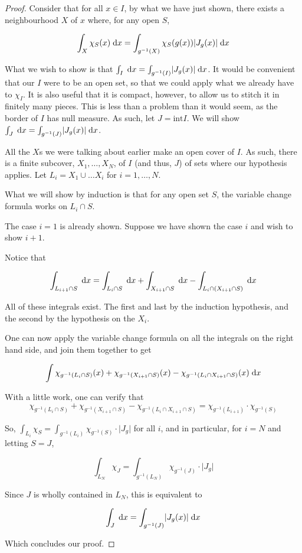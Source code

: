 \documentclass[11pt]{article}
\theoremstyle{definition}
\theoremstyle{plain}
\newcommand{\mo}{^{-1}}
\begin{document}
\begin{proof}
Consider that for all $x \in I$, by what we have just shown, there exists a neighbourhood $X$ of $x$ where, for any open $S$,

\[ \int_X \chi_S(x) \d x = \int_{g\mo(X)} \chi_S(g(x)) \rvert J_g(x) \lvert \d x \]

What we wish to show is that $\int_I \d x = \int_{g\mo(I)} \rvert J_g(x) \lvert \d x$. It would be convenient that our $I$ were to be an open set, so that we could apply what we already have to $\chi_I$. It is also useful that it is compact, however, to allow us to stitch it in finitely many pieces. This is less than a problem than it would seem, as the border of $I$ has null measure. As such, let $J = \textrm{int} I$. We will show $\int_J \d x = \int_{g\mo(J)} \rvert J_g(x) \lvert \d x$.

All the $X$s we were talking about earlier make an open cover of $I$. As such, there is a finite subcover, $X_1, \ldots, X_N$, of $I$ (and thus, $J$) of sets where our hypothesis applies. Let $L_i = X_1 \cup \ldots X_i$ for $i = 1, \ldots, N$.

What we will show by induction is that for any open set $S$, the variable change formula works on $L_i \cap S$.

The case $i = 1$ is already shown. Suppose we have shown the case $i$ and wish to show $i+1$.

Notice that

\[\int_{L_{i+1} \cap S} \d x = \int_{L_i \cap S} \d x + \int_{X_{i+1} \cap S} \d x  - \int_{L_i \cap (X_{i+1} \cap S)} \d x\]

All of these integrals exist. The first and last by the induction hypothesis, and the second by the hypothesis on the $X_i$.

One can now apply the variable change formula on all the integrals on the right hand side, and join them together to get

\[ \int \chi_{g\mo(L_i \cap S)}(x) + \chi_{g\mo(X_{i+1} \cap S)}(x) - \chi_{g\mo(L_i \cap X_{i+1}\cap S)}(x) \d x \]

With a little work, one can verify that
\[\chi_{g\mo(L_i \cap S)} + \chi_{g\mo(X_{i+1} \cap S)} - \chi_{g\mo(L_i \cap X_{i+1}\cap S)} = \chi_{g\mo(L_{i+1})} \cdot \chi_{g\mo(S)}\]

So, $\int_{L_i} \chi_S = \int_{g\mo(L_i)} \chi_{g\mo(S)} \cdot \lvert J_g \rvert$ for all $i$, and in particular, for $i = N$ and letting $S = J$,

\[ \int_{L_N} \chi_J = \int_{g\mo(L_N)} \chi_{g\mo(J)} \cdot \lvert J_g \rvert \]

Since $J$ is wholly contained in $L_N$, this is equivalent to

\[ \int_J \d x = \int_{g\mo(J)} \lvert J_g(x) \rvert \d x \]

Which concludes our proof.

\end{proof}
\end{document}
